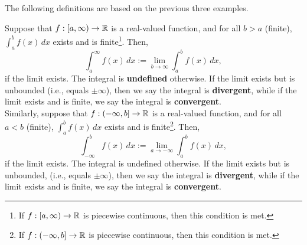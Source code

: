 \bigskip
The following definitions are based on the previous three examples. 
\bigskip

\begin{tcolorbox}[colback=mylightblue, title = {\bf Unbounded Upper or Lower Limit: Take 1}, breakable]
\begin{definition}
\label{def:unboundedLimitsOfIntegration}
Suppose that  $f:[a, \infty) \to  \mathbb R$ is a real-valued function, and for all $b>a$ (finite), $\int_a^b f(x) \, dx$ exists and is finite\footnote{If $f:[a, \infty) \to  \mathbb R$ is piecewise continuous, then this condition is met.}. Then,
\begin{equation}
    \label{eq:unboundedUpperLimit}
    \int_a^\infty f(x) \, dx := \lim_{b \to \infty} \int_a^b f(x) \, dx,
\end{equation}
if the limit exists. The integral is \textbf{undefined} otherwise. If the limit exists but is unbounded (i.e., equals $\pm \infty$), then we say the integral is \textbf{divergent}, while if the limit exists and is finite, we say the integral is \textbf{convergent}.\\

Similarly, suppose that  $f:(-\infty, b] \to  \mathbb R$ is a real-valued function, and for all $a<b$ (finite), $\int_a^b f(x) \, dx$ exists and is finite\footnote{If $f:(-\infty, b] \to  \mathbb R$ is piecewise continuous, then this condition is met.}. Then,
\begin{equation}
    \label{eq:unboundedLowerLimit}
    \int_{-\infty}^b f(x) \, dx := \lim_{a \to -\infty} \int_a^b f(x) \, dx,
\end{equation}
if the limit exists. The integral is undefined otherwise. If the limit exists but is unbounded, (i.e., equals $\pm \infty$), then we say the integral is \textbf{divergent}, while if the limit exists and is finite, we say the integral is \textbf{convergent}.\\

\end{definition}

\end{tcolorbox}


\bigskip


